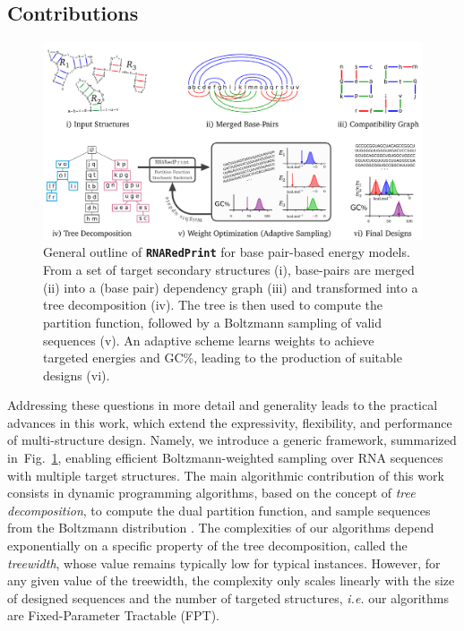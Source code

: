 \documentclass[twocolumn]{bmcart}%
\newcommand{\Def}[1]{\emph{#1}}
\newcommand{\Nuc}[1]{{\sf #1}}
\newcommand{\Cb}{\Nuc{C}}
\newcommand{\Gb}{\Nuc{G}}
\newcommand{\GCb}{\Gb\Cb}
\newcommand{\ourprog}{{\tt \bfseries{}\color{black!85}RNA\textcolor{red!70!black}{Red}Print}}
\begin{document}

\subsection*{Contributions}

\begin{figure}[t]
\begin{center}
    \includegraphics[width=.8\textwidth]{Figs/Workflow}
\end{center}
\caption{General outline of \ourprog{} for base pair-based energy models. From a set of target secondary structures (i), base-pairs are merged (ii) into a (base pair) dependency graph (iii) and transformed into a tree decomposition (iv). The tree is then used to compute the partition function, followed by a Boltzmann sampling of valid sequences (v). An adaptive scheme learns weights to achieve targeted energies and \GCb\%, leading to the production of suitable designs (vi).}
\label{fig:workflow}
\end{figure}

Addressing these questions in more detail and generality leads to the practical advances in this work, which extend the expressivity, flexibility, and performance of multi-structure design. Namely, we introduce a generic framework, summarized in~Fig.~\ref{fig:workflow}, enabling efficient Boltzmann-weighted sampling over RNA sequences with multiple target structures. The main algorithmic contribution of this work consists in dynamic programming algorithms, based on the concept of \Def{tree decomposition}, to compute the dual partition function, and sample sequences from the Boltzmann distribution%
. The complexities of our algorithms depend exponentially on a specific property of the tree decomposition, called the \Def{treewidth}, whose value remains typically low for typical instances. However, for any given value of the treewidth, the complexity only scales linearly with the size of designed sequences and the number of targeted structures, \emph{i.e.} our algorithms are Fixed-Parameter Tractable (FPT).
\end{document}
